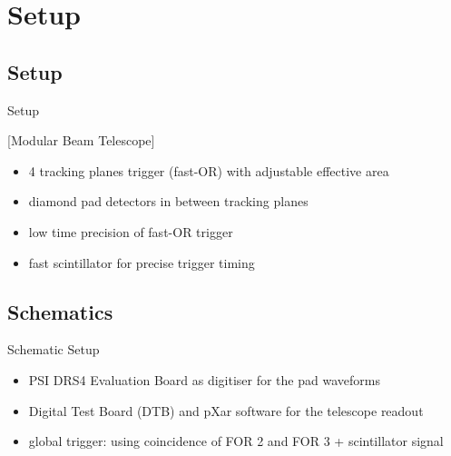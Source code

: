 \section{Setup}
\subsection{Setup}
\begin{frame}{Setup}

	[Modular Beam Telescope]\vspace{-10pt}

	\begin{itemize}\itemfill
		\item 4 tracking planes \ra trigger (fast-OR) with adjustable effective area
		\item diamond pad detectors in between tracking planes
		\item low time precision of fast-OR trigger
		\item fast scintillator for precise trigger timing \ra {}
	\end{itemize}

\end{frame}
\subsection{Schematics}
\begin{frame}{Schematic Setup}
 
	\vspace*{-10pt}\vspace*{-10pt}
 
	\begin{itemize}\itemfill
		\item PSI DRS4 Evaluation Board as digitiser for the pad waveforms
		\item Digital Test Board (DTB) and pXar software for the telescope readout
		\item global trigger: using coincidence of FOR 2 and FOR 3 + scintillator signal
	\end{itemize}

\end{frame}
